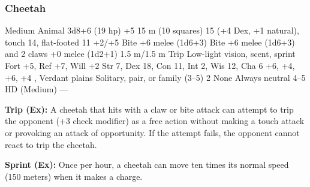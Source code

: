 \subsubsection{Cheetah}
\begin{MonsterStats}
{Medium Animal}
{3d8+6 (19 hp)}
{+5}
{15 m (10 squares)}
{15 (+4 Dex, +1 natural), touch 14, flat-footed 11}
{+2/+5}
{Bite +6 melee (1d6+3)}
{Bite +6 melee (1d6+3) and 2 claws +0 melee (1d2+1)}
{1.5 m/1.5 m}
{Trip}
{Low-light vision, scent, sprint}
{Fort +5, Ref +7, Will +2}
{Str 7, Dex 18, Con 11, Int 2, Wis 12, Cha 6}
{ +6,  +4,  +6,  +4}
{, }
{Verdant plains}
{Solitary, pair, or family (3--5)}
{2}
{None}
{Always neutral}
{4--5 HD (Medium)}
{---}
\end{MonsterStats}

\textbf{Trip (Ex):} A cheetah that hits with a claw or bite attack can attempt to trip the opponent (+3 check modifier) as a free action without making a touch attack or provoking an attack of opportunity. If the attempt fails, the opponent cannot react to trip the cheetah.

\textbf{Sprint (Ex):} Once per hour, a cheetah can move ten times its normal speed (150 meters) when it makes a charge.
